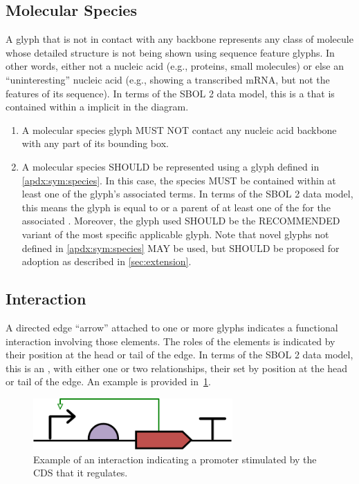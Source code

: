 \subsection{Molecular Species}
A glyph that is not in contact with any backbone represents any class of molecule whose detailed structure is not being shown using sequence feature glyphs.
In other words, either not a nucleic acid (e.g., proteins, small molecules) or else an ``uninteresting'' nucleic acid (e.g., showing a transcribed mRNA, but not the features of its sequence).
In terms of the SBOL 2 data model, this is a  that is contained within a  implicit in the diagram.

\begin{enumerate}
\item A molecular species glyph MUST NOT contact any nucleic acid backbone with any part of its bounding box.
\item A molecular species SHOULD be represented using a glyph defined in \ref{apdx:sym:species}.  In this case, the species MUST be contained within at least one of the glyph's associated terms.
In terms of the SBOL 2 data model, this means the glyph is equal to or a parent of at least one of the  for the associated .
	Moreover, the glyph used SHOULD be the RECOMMENDED variant of the most specific applicable glyph.  Note that novel glyphs not defined in \ref{apdx:sym:species} MAY be used, but SHOULD be proposed for adoption as described in \ref{sec:extension}.
\end{enumerate}


\subsection{Interaction}

A directed edge ``arrow'' attached to one or more glyphs indicates a functional interaction involving those elements.
The roles of the elements is indicated by their position at the head or tail of the edge.
In terms of the SBOL 2 data model, this is an , with either one or two  relationships, their  set by position at the head or tail of the edge.
	An example is provided in~\ref{exa:4}.

	\begin{figure}[h!]
	\centering
	\includegraphics[width=3in]{figures/examples/4-regulation.pdf}
	\caption{Example of an interaction indicating a promoter stimulated by the CDS that it regulates.}
	\label{exa:4}
	\end{figure}
		
